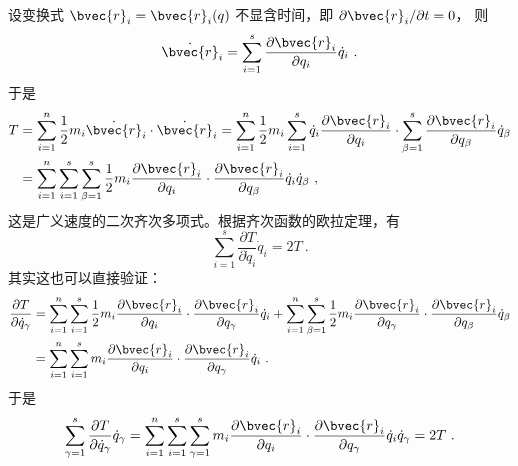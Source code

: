 设变换式 $\bvec{r}_{i}=\bvec{r}_{i}(q)$ 不显含时间，即 $\partial \bvec{r}_{i} / \partial t=0$， 则
\begin{equation}
\dot{\bvec{r}}_{i}=\sum_{i=1}^{s} \frac{\partial \bvec{r}_{i}}{\partial q_{i}} \dot{q}_{i}~.
\end{equation}
于是
\begin{equation}
\begin{aligned} T &=\sum_{i=1}^{n} \frac{1}{2} m_{i} \dot{\bvec{r}}_{i} \cdot \dot{\bvec{r}}_{i}=\sum_{i=1}^{n} \frac{1}{2} m_{i} \sum_{i=1}^{s} \dot{q}_{i} \frac{\partial \bvec{r}_{i}}{\partial q_{i}} \cdot \sum_{\beta=1}^{s} \frac{\partial \bvec{r}_{i}}{\partial q_{\beta}} \dot{q}_{\beta} \\ &=\sum_{i=1}^{n} \sum_{i=1}^{s} \sum_{\beta=1}^{s} \frac{1}{2} m_{i} \frac{\partial \bvec{r}_{i}}{\partial q_{i}} \cdot \frac{\partial \bvec{r}_{i}}{\partial q_{\beta}} \dot{q}_{i} \dot{q}_{\beta}~, \end{aligned}
\end{equation}
这是广义速度的二次齐次多项式。根据齐次函数的欧拉定理，有
\begin{equation} \label{motint_eq3}
\sum_{i=1}^{s} \frac{\partial T}{\partial \dot{q}_{i}} \dot{q}_{i}=2 T~.
\end{equation}
其实这也可以直接验证：
\begin{equation}
\begin{aligned} \frac{\partial T}{\partial \dot{q}_{\gamma}} &=\sum_{i=1}^{n} \sum_{i=1}^{s} \frac{1}{2} m_{i} \frac{\partial \bvec{r}_{i}}{\partial q_{i}} \cdot \frac{\partial \bvec{r}_{i}}{\partial q_{\gamma}} \dot{q}_{i}+\sum_{i=1}^{n} \sum_{\beta=1}^{s} \frac{1}{2} m_{i} \frac{\partial \bvec{r}_{i}}{\partial q_{\gamma}} \cdot \frac{\partial \bvec{r}_{i}}{\partial q_{\beta}} \dot{q}_{\beta} \\ &=\sum_{i=1}^{n} \sum_{i=1}^{s} m_{i} \frac{\partial \bvec{r}_{i}}{\partial q_{i}} \cdot \frac{\partial \bvec{r}_{i}}{\partial q_{\gamma}} \dot{q}_{i} ~.\end{aligned}
\end{equation}
于是
\begin{equation}
\sum_{\gamma=1}^{s} \frac{\partial T}{\partial \dot{q}_{\gamma}} \dot{q}_{\gamma}=\sum_{i=1}^{n} \sum_{i=1}^{s} \sum_{\gamma=1}^{s} m_{i} \frac{\partial \bvec{r}_{i}}{\partial q_{i}} \cdot \frac{\partial \bvec{r}_{i}}{\partial q_{\gamma}} \dot{q}_{i} \dot{q}_{\gamma}=2 T~.
\end{equation}

